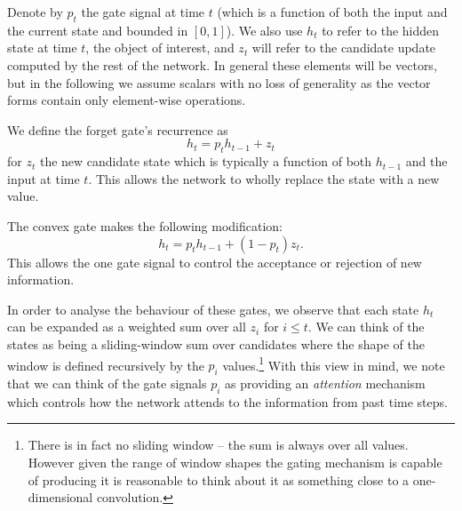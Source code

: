 Denote by \(p_t\) the gate signal at time \(t\) (which is a
function of both the input and the current state and bounded in \([0, 1]\)). We also use
\(h_t\) to refer to the hidden state at time \(t\), the object of interest, and \(z_t\) will
refer to the candidate update computed by the rest of the network. In general these
elements will be vectors, but in the following we assume scalars with no loss of generality as
the vector forms contain only element-wise operations.

We define the
forget gate's recurrence as
\begin{equation}
	h_t = p_th_{t-1} + z_t
	\label{eq:forgetgate}
\end{equation} for \(z_t\) the new candidate state which is typically a function of
both \(h_{t-1}\) and the input at time \(t\). This allows the network to wholly replace the
state with a new value.

The convex gate makes the following modification:
\begin{equation}
	h_t = p_th_{t-1} + (1-p_t)z_t.
	\label{eq:cvexgate}
\end{equation} This allows the one gate signal
to control the acceptance or rejection of new information.

In order to analyse the behaviour of these gates, we observe that each state \(h_t\)
can be expanded as a weighted sum over all \(z_i\) for \(i \leq t\). We can think of
the states as being a sliding-window sum over candidates where the shape of the window is defined
recursively by the \(p_i\) values.\footnote{There is in fact no sliding window -- the sum is always
over all values. However given the range of window shapes the gating mechanism is capable of producing
it is reasonable to think about it as something close to a one-dimensional convolution.}
With this view in mind, we note that we can think of the
gate signals \(p_i\) as providing an \emph{attention} mechanism which controls how the network
attends to the information from past time steps.

